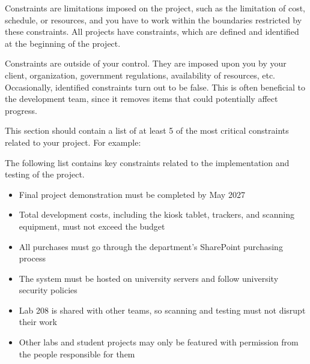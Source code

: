 Constraints are limitations imposed on the project, such as the limitation of cost, schedule, or resources, and you have to work within the boundaries restricted by these constraints. All projects have constraints, which are defined and identified at the beginning of the project.

Constraints are outside of your control. They are imposed upon you by your client, organization, government regulations, availability of resources, etc. Occasionally, identified constraints turn out to be false. This is often beneficial to the development team, since it removes items that could potentially affect progress.

This section should contain a list of at least 5 of the most critical constraints related to your project. For example:

The following list contains key constraints related to the implementation and testing of the project.


\begin{itemize}
    \item Final project demonstration must be completed by May 2027
    \item Total development costs, including the kiosk tablet, trackers, and scanning equipment, must not exceed the budget
    \item All purchases must go through the department's SharePoint purchasing process
    \item The system must be hosted on university servers and follow university security policies
    \item Lab 208 is shared with other teams, so scanning and testing must not disrupt their work
    \item Other labs and student projects may only be featured with permission from the people responsible for them
\end{itemize}